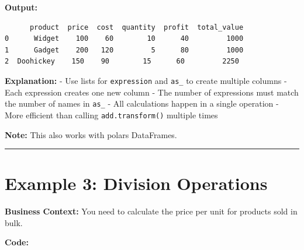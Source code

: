 \documentclass[
  letterpaper,
]{scrbook}
\begin{document}
\textbf{Output:}

\begin{verbatim}
      product  price  cost  quantity  profit  total_value
0      Widget    100    60        10      40         1000
1      Gadget    200   120         5      80         1000
2  Doohickey    150    90        15      60         2250
\end{verbatim}

\textbf{Explanation:} - Use lists for \texttt{expression} and
\texttt{as\_} to create multiple columns - Each expression creates one
new column - The number of expressions must match the number of names in
\texttt{as\_} - All calculations happen in a single operation - More
efficient than calling \texttt{add.transform()} multiple times

\textbf{Note:} This also works with polars DataFrames.

\begin{center}\rule{0.5\linewidth}{0.5pt}\end{center}

\section{Example 3: Division
Operations}\label{example-3-division-operations}

\textbf{Business Context:} You need to calculate the price per unit for
products sold in bulk.

\textbf{Code:}
\end{document}
